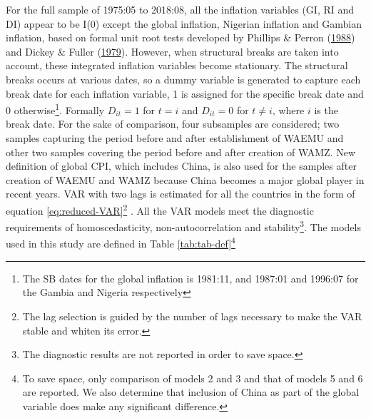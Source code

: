 \documentclass[]{article}
\let\rmarkdownfootnote\footnote%
\def\footnote{\protect\rmarkdownfootnote}
\begin{document}
For the full sample of 1975:05 to 2018:08, all the inflation variables (GI, RI and DI) appear to be I(0) except the global inflation, Nigerian inflation and Gambian inflation, based on formal unit root tests developed by Phillips \& Perron (\protect\hyperlink{ref-10.2307ux2f2336182}{1988}) and Dickey \& Fuller (\protect\hyperlink{ref-Dickey1979}{1979}). However, when structural breaks are taken into account, these integrated inflation variables become stationary. The structural breaks occurs at various dates, so a dummy variable is generated to capture each break date for each inflation variable, 1 is assigned for the specific break date and 0 otherwise\footnote{The SB dates for the global inflation is 1981:11, and 1987:01 and 1996:07 for the Gambia and Nigeria respectively}. Formally \(D_{it}=1\) for \(t=i\) and \(D_{it}=0\) for \(t\neq i\), where \(i\) is the break date. For the sake of comparison, four subsamples are considered; two samples capturing the period before and after establishment of WAEMU and other two samples covering the period before and after creation of WAMZ. New definition of global CPI, which includes China, is also used for the samples after creation of WAEMU and WAMZ because China becomes a major global player in recent years. VAR with two lags is estimated for all the countries in the form of equation \eqref{eq:reduced-VAR}\footnote{The lag selection is guided by the number of lags necessary to make the VAR stable and whiten its error.} . All the VAR models meet the diagnostic requirements of homoscedasticity, non-autocorrelation and stability\footnote{The diagnostic results are not reported in order to save space.}. The models used in this study are defined in Table \ref{tab:tab-def}\footnote{To save space, only comparison of models 2 and 3 and that of models 5 and 6 are reported. We also determine that inclusion of China as part of the global variable does make any significant difference.}
\end{document}
